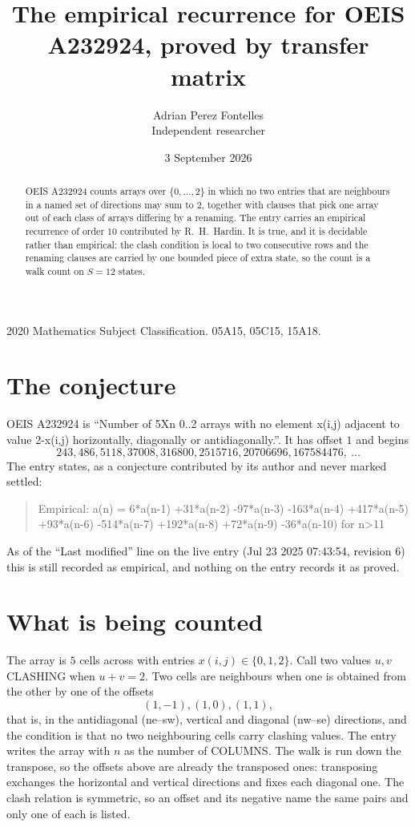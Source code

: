 \documentclass[11pt,a4paper]{article}
\title{The empirical recurrence for OEIS A232924, proved by transfer matrix}
\author{Adrian Perez Fontelles\\ \small Independent researcher}
\date{3 September 2026}
\theoremstyle{plain}
\theoremstyle{definition}
\begin{document}
\maketitle

\begin{abstract}
OEIS A232924 counts arrays over $\{0,\dots,2\}$ in which no two entries that are neighbours in
a named set of directions may sum to $2$, together with clauses that pick one array out of
each class of arrays differing by a renaming. The entry carries an empirical recurrence of
order $10$ contributed by R.~H.~Hardin. It is true, and it is decidable rather than
empirical: the clash condition is local to two consecutive rows and the renaming clauses are
carried by one bounded piece of extra state, so the count is a walk count on $S=12$ states.
\end{abstract}

\noindent\small 2020 Mathematics Subject Classification. 05A15, 05C15, 15A18.\normalsize

\section{The conjecture}

OEIS A232924 is ``Number of 5Xn 0..2 arrays with no element x(i,j) adjacent to value 2-x(i,j) horizontally, diagonally or antidiagonally.''. It has offset $1$ and begins
\[
243, 486, 5118, 37008, 316800, 2515716, 20706696, 167584476,\ \dots
\]
The entry states, as a conjecture contributed by its author and never marked settled:
\begin{quote}
Empirical: a(n) = 6*a(n-1) +31*a(n-2) -97*a(n-3) -163*a(n-4) +417*a(n-5) +93*a(n-6) -514*a(n-7) +192*a(n-8) +72*a(n-9) -36*a(n-10) for n>11
\end{quote}
As of the ``Last modified'' line on the live entry (Jul 23 2025 07:43:54, revision 6) this is still
recorded as empirical, and nothing on the entry records it as proved.

\section{What is being counted}

The array is $5$ cells across with entries $x(i,j)\in\{0,1,2\}$. Call two values $u,v$ CLASHING
when $u+v=2$. Two cells are neighbours when one is obtained from the other by one of
the offsets
\[
(1,-1), (1,0), (1,1),
\]
that is, in the antidiagonal (ne--sw), vertical and diagonal (nw--se) directions, and the condition is that no two neighbouring cells carry
clashing values. The entry writes the array with $n$ as the number of COLUMNS. The walk is run down the transpose, so the offsets above are already the transposed ones: transposing exchanges the horizontal and vertical directions and fixes each diagonal one. The clash relation is symmetric, so an offset and its negative name the
same pairs and only one of each is listed.
\end{document}
